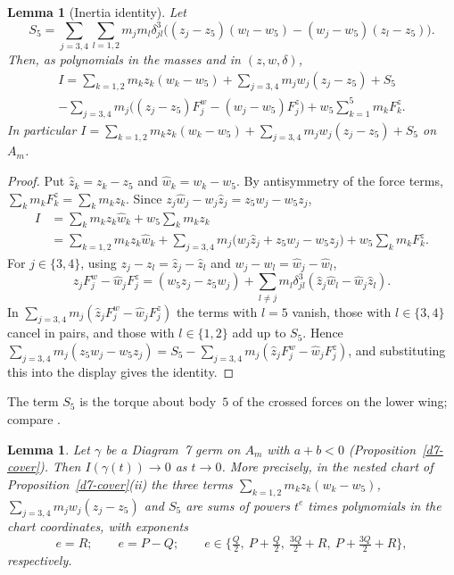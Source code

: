 \documentclass[11pt]{amsart}
\newtheorem{lemma}[theorem]{Lemma}
\theoremstyle{definition}
\theoremstyle{remark}
\begin{document}
\begin{lemma}[Inertia identity]\label{d7-identity}
Let
\[
  S_5=\sum_{j=3,4}\sum_{l=1,2}m_jm_l\delta_{jl}^3
  \bigl((z_j-z_5)(w_l-w_5)-(w_j-w_5)(z_l-z_5)\bigr).
\]
Then, as polynomials in the masses and in $(z,w,\delta)$,
\begin{multline*}
  I=\sum_{k=1,2}m_kz_k(w_k-w_5)+\sum_{j=3,4}m_jw_j(z_j-z_5)+S_5\\
  -\sum_{j=3,4}m_j\bigl((z_j-z_5)F^w_j-(w_j-w_5)F^z_j\bigr)+w_5\sum_{k=1}^5m_kF^z_k.
\end{multline*}
In particular $I=\sum_{k=1,2}m_kz_k(w_k-w_5)+\sum_{j=3,4}m_jw_j(z_j-z_5)+S_5$ on $A_m$.
\end{lemma}

\begin{proof}
Put $\hat z_k=z_k-z_5$ and $\hat w_k=w_k-w_5$.  By antisymmetry of the force terms,
$\sum_km_kF^z_k=\sum_km_kz_k$.  Since $z_j\hat w_j-w_j\hat z_j=z_5w_j-w_5z_j$,
\begin{align*}
  I&=\sum_km_kz_k\hat w_k+w_5\sum_km_kz_k\\
   &=\sum_{k=1,2}m_kz_k\hat w_k+\sum_{j=3,4}m_j\bigl(w_j\hat z_j+z_5w_j-w_5z_j\bigr)
    +w_5\sum_km_kF^z_k.
\end{align*}
For $j\in\{3,4\}$, using $z_j-z_l=\hat z_j-\hat z_l$ and $w_j-w_l=\hat w_j-\hat w_l$,
\[
  \hat z_jF^w_j-\hat w_jF^z_j=(w_5z_j-z_5w_j)
  +\sum_{l\ne j}m_l\delta_{jl}^3(\hat z_j\hat w_l-\hat w_j\hat z_l).
\]
In $\sum_{j=3,4}m_j(\hat z_jF^w_j-\hat w_jF^z_j)$ the terms with $l=5$ vanish, those with
$l\in\{3,4\}$ cancel in pairs, and those with $l\in\{1,2\}$ add up to $S_5$.  Hence
$\sum_{j=3,4}m_j(z_5w_j-w_5z_j)=S_5-\sum_{j=3,4}m_j(\hat z_jF^w_j-\hat w_jF^z_j)$, and
substituting this into the display gives the identity.
\end{proof}

The term $S_5$ is the torque about body~$5$ of the crossed forces on the lower wing; compare
\cite[(31)]{AK}.

\begin{lemma}\label{d7-vanish}
Let $\gamma$ be a Diagram~7 germ on $A_m$ with $a+b<0$ (Proposition~\ref{d7-cover}).  Then
$I(\gamma(t))\to0$ as $t\to0$.
More precisely, in the nested chart of Proposition~\ref{d7-cover}(ii) the three terms
$\sum_{k=1,2}m_kz_k(w_k-w_5)$, $\sum_{j=3,4}m_jw_j(z_j-z_5)$ and $S_5$ are sums of powers $t^e$
times polynomials in the chart coordinates, with exponents
\[
  e=R;\qquad e=P-Q;\qquad e\in\bigl\{\tfrac Q2,\ P+\tfrac Q2,\ \tfrac{3Q}2+R,\ P+\tfrac{3Q}2+R\bigr\},
\]
respectively.
\end{lemma}
\end{document}
